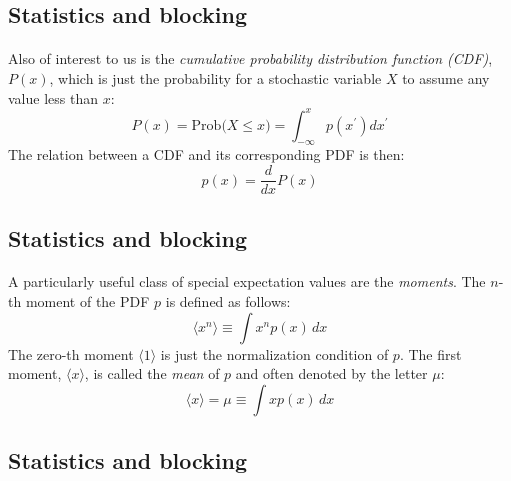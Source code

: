 \documentclass[%
twoside,                 %
final,                   %
10pt]{article}
\begin{document}
\subsection*{Statistics and blocking}

\paragraph{}
Also of interest to us is the \emph{cumulative probability distribution function (CDF)}, $P(x)$, which is just the probability
for a stochastic variable $X$ to assume any value less than $x$:
\[
P(x)=\mathrm{Prob(}X\leq x\mathrm{)} =\int_{-\infty}^x p(x^{\prime})dx^{\prime}
\]
The relation between a CDF and its corresponding PDF is then:
\[
p(x) = \frac{d}{dx}P(x)
\]



\subsection*{Statistics and blocking}

\paragraph{}
A particularly useful class of special expectation values are the
\emph{moments}. The $n$-th moment of the PDF $p$ is defined as
follows:
\[
\langle x^n\rangle \equiv \int\! x^n p(x)\,dx
\]
The zero-th moment $\langle 1\rangle$ is just the normalization condition of
$p$. The first moment, $\langle x\rangle$, is called the \emph{mean} of $p$
and often denoted by the letter $\mu$:
\[
\langle x\rangle = \mu \equiv \int\! x p(x)\,dx
\]



\subsection*{Statistics and blocking}

\end{document}
